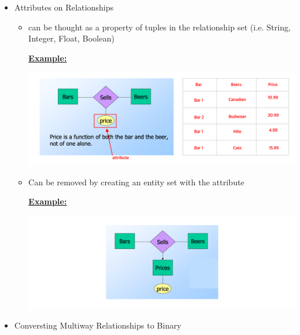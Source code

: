 \documentclass[12pt]{article}
\begin{document}
\begin{enumerate}[1.]
\begin{itemize}
        \item Attributes on Relationships

        \begin{itemize}
            \item can be thought as a property of tuples in the relationship set
            (i.e. String, Integer, Float, Boolean)

            \bigskip

            \underline{\textbf{Example:}}

            \bigskip

            \begin{center}
            \includegraphics[width=\linewidth]{images/worksheet_14_solution_9.png}
            \end{center}

            \item Can be removed by creating an entity set with the attribute

            \bigskip

              \underline{\textbf{Example:}}

            \bigskip

            \begin{center}
            \includegraphics[width=\linewidth]{images/worksheet_14_solution_10.png}
            \end{center}
        \end{itemize}

        \item Conversting Multiway Relationships to Binary


\end{itemize}
\end{enumerate}
\end{document}
